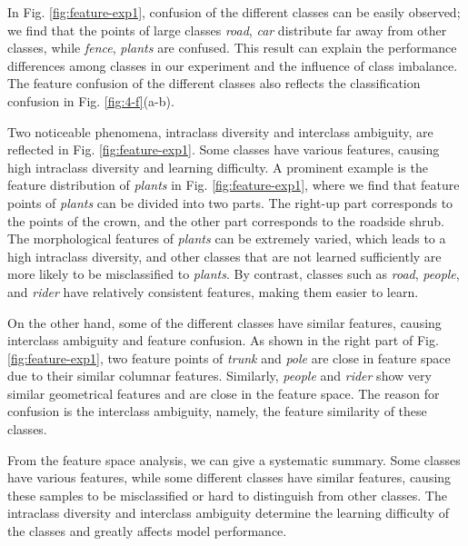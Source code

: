 \documentclass[journal]{IEEEtran}
\begin{document}
In Fig. \ref{fig:feature-exp1}, confusion of the different classes can be easily observed; we find that the points of large classes \textit{road}, \textit{car} distribute far away from other classes, while \textit{fence}, \textit{plants} are confused. This result can explain the performance differences among classes in our experiment and the influence of class imbalance. The feature confusion of the different classes also reflects the classification confusion in Fig. \ref{fig:4-f}(a-b).

Two noticeable phenomena, intraclass diversity and interclass ambiguity, are reflected in Fig. \ref{fig:feature-exp1}. Some classes have various features, causing high intraclass diversity and learning difficulty. A prominent example is the feature distribution of \textit{plants} in Fig. \ref{fig:feature-exp1}, where we find that feature points of \textit{plants} can be divided into two parts. The right-up part corresponds to the points of the crown, and the other part corresponds to the roadside shrub. The morphological features of \textit{plants} can be extremely varied, which leads to a high intraclass diversity, and other classes that are not learned sufficiently are more likely to be misclassified to \textit{plants}. By contrast, classes such as \textit{road}, \textit{people}, and \textit{rider} have relatively consistent features, making them easier to learn.

On the other hand, some  of the different classes have similar features, causing interclass ambiguity and feature confusion. As shown in the right part of Fig. \ref{fig:feature-exp1}, two feature points of \textit{trunk} and \textit{pole} are close in feature space due to their similar columnar features. Similarly, \textit{people} and \textit{rider} show very similar geometrical features and are close in the feature space. The reason for confusion is the interclass ambiguity, namely, the feature similarity of these classes.

From the feature space analysis, we can give a systematic summary. Some classes have various features, while some different classes have similar features, causing these samples to be misclassified or hard to distinguish from other classes. The intraclass diversity and interclass ambiguity determine the learning difficulty of the classes and greatly affects model performance.
\end{document}
